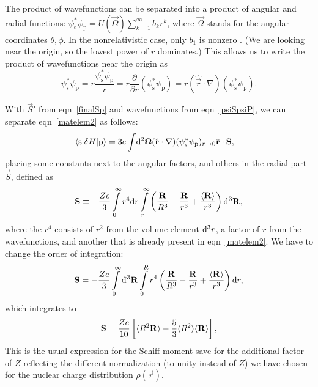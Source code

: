 The product of wavefunctions can be separated into a product of angular and
radial functions: $\psi^*_\text{s}\psi_\text{p}=U(\vec\Omega)\sum_{k=1}^\infty
b_kr^k$, where $\vec\Omega$ stands for the angular coordinates $\theta,\phi$. In
the nonrelativistic case, only $b_1$ is nonzero \cite{flambaum2002nuclear}. (We
are looking near the origin, so the lowest power of $r$ dominates.) This allows
us to write the product of wavefunctions near the origin as
%
\begin{equation}
    \label{psiSpsiP}
\psi^*_\text{s}\psi_\text{p}
=r\frac{\psi^*_\text{s}\psi_\text{p}}{r}
=r\frac{\partial}{\partial r}(\psi^*_\text{s}\psi_\text{p})
=r(\hat{\vec r}\cdot\nabla)(\psi^*_\text{s}\psi_\text{p}).
\end{equation}

With $\vec S'$ from eqn~\ref{finalSp} and wavefunctions from eqn~\ref{psiSpsiP},
we can separate eqn~\ref{matelem2} as follows:
%
\begin{align}
    \label{separated}
    \langle\text{s}|\delta H|\text{p}\rangle
    =
    3e\int&\mathrm{d}^2\mathbf{\Omega}
    (\hat{\mathbf{r}}\cdot\nabla)(\psi^*_\text{s}\psi_\text{p})_{r\to0}
    \hat{\mathbf{r}}\cdot\mathbf{S},
\end{align}
%
placing some constants next to the angular factors, and others in the radial
part $\vec S$, defined as
%
\[
    \mathbf{S}
    \equiv
    -\frac{Ze}{3}
    \int\limits_0^\infty r^4\mathrm{d} r
    \int\limits_r^\infty
    \left(
    \frac{\mathbf{R}}{R^3}-\frac{\mathbf{R}}{r^3}+\frac{\langle \mathbf{R}\rangle}{r^3}
    \right)
    \mathrm{d}\hspace*{-0.15em}\bar{}\hspace*{0.2em}^3\mathbf{R},
\]
%
where the $r^4$ consists of $r^2$ from the volume element $\mathrm{d}^3r$, a factor of
$r$ from the wavefunctions, and another that is already present in
eqn~\ref{matelem2}. We have to change the order of integration:
%
\[
    \mathbf{S}=-\frac{Ze}{3}
    \int\limits_0^\infty\mathrm{d}\hspace*{-0.15em}\bar{}\hspace*{0.2em}^3\mathbf{R}
    \int\limits_0^Rr^4
    \left(
    \frac{\mathbf{R}}{R^3}-\frac{\mathbf{R}}{r^3}+\frac{\langle \mathbf{R}\rangle}{r^3}
    \right)\mathrm{d} r,
\]
%
which integrates to
%
\begin{equation}
    \label{simpleSchiffMoment}
    \mathbf{S}=\frac{Ze}{10}
    \left[
        \langle R^2\mathbf{R}\rangle - \frac{5}{3}\langle R^2\rangle\langle \mathbf{R}\rangle
        \right],
\end{equation}
%
This is the usual expression for the Schiff moment
\cite[eqn~29]{sushkov1984possibility} save for the additional factor of $Z$
reflecting the different normalization (to unity instead of $Z$) we have chosen
for the nuclear charge distribution $\rho(\vec r)$.

